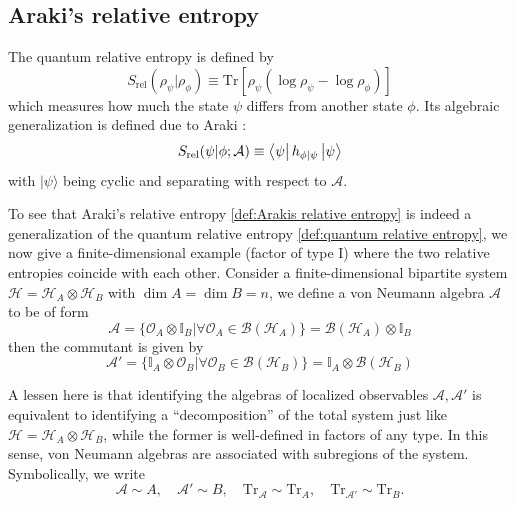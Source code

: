 \documentclass[a4paper,11pt]{article}
\newcommand{\ket}[1]{| #1 \rangle } %
\newcommand{\diracprod}[3]{\left\langle  #1 \vphantom{#2#3} \right|#2 \left| #3 \vphantom{#1#2} \right\rangle } %
\renewcommand{\=}[1]{\stackrel{#1}{=}} %
\def\A{\mathcal{A}}
\def\B{\mathcal{B}}
\def\O{\mathcal{O}}
\def\H{\mathcal{H}}
\def\Tr{\text{Tr}}
\def\Srel{S_{\text{rel}}}
\begin{document}
\subsection{Araki's relative entropy}


The quantum relative entropy is defined by
\begin{equation}\label{def:quantum relative entropy}
	\Srel(\rho_\psi|\rho_\phi)\equiv\Tr\left[\rho_{\psi}\left(\log\rho_{\psi}-\log\rho_{\phi}\right)\right]
\end{equation}
which measures how much the state $\psi$ differs from another state $\phi$. Its algebraic generalization is defined due to Araki \cite{araki1975relative,araki1975inequalities}:
\begin{equation}\label{def:Arakis relative entropy}
	\Srel(\psi|\phi;\A)\equiv\diracprod{\psi}{h_{\phi|\psi}}{\psi}
\end{equation}
with $\ket{\psi}$ being cyclic and separating with respect to $\A$.





To see that Araki's relative entropy \eqref{def:Arakis relative entropy} is indeed a generalization of the quantum relative entropy \eqref{def:quantum relative entropy}, we now give a finite-dimensional example (factor of type I) \cite{Witten:2018zxz} where the two relative entropies coincide with each other. Consider a finite-dimensional bipartite system $\H=\H_A\otimes\H_B$ with $\dim A=\dim B=n$, we define a von Neumann algebra $\A$ to be of form
\begin{equation}
	\A=\{\O_A \otimes \mathbb{I}_B|\forall \O_A\in \B(\H_A)\}=\B(\H_A)\otimes \mathbb{I}_B
\end{equation}
then the commutant is given by
\begin{equation}
	\A'=\{\mathbb{I}_A \otimes \O_B|\forall \O_B\in \B(\H_B)\}=\mathbb{I}_A \otimes\B(\H_B)
\end{equation}

A lessen here is that identifying the algebras of localized observables $\A,\A'$ is equivalent to identifying a ``decomposition'' of the total system just like $\H=\H_A\otimes\H_B$, while the former is well-defined in factors of any type. In this sense, von Neumann algebras are associated with subregions of the system. Symbolically, we write 
\begin{equation}
	\A \sim A,\quad \A' \sim B,\quad \Tr_{\A}\sim \Tr_{A},\quad \Tr_{\A'}\sim\Tr_B.
\end{equation}
\end{document}
